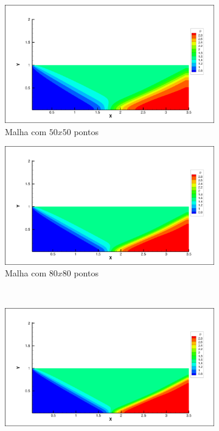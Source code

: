 \documentclass[a4paper, twoside, 12pt]{article}
\numberwithin{equation}{section}
\begin{document}
        \begin{figure}[H]

            \begin{subfigure}{.5\textwidth}
            \centering
            \includegraphics[width=.9\linewidth]{pics/pressure_5050.png}
            \caption{Malha com $50x50$ pontos}
            \label{fig:sfig1}
            \end{subfigure}%
            \begin{subfigure}{.5\textwidth}
            \centering
            \includegraphics[width=.9\linewidth]{pics/pressure_8080.png}
            \caption{Malha com $80x80$ pontos}
            \label{fig:sfig2}
            \end{subfigure}
            \\
            \begin{subfigure}{.5\textwidth}
            \centering
            \includegraphics[width=.9\linewidth]{pics/pressure_110110.png}

\end{subfigure}
\end{figure}
\end{document}
